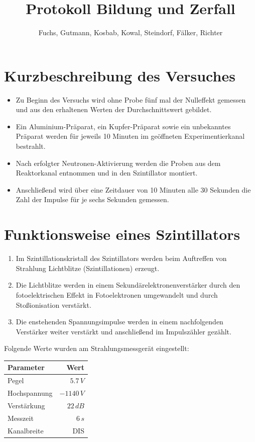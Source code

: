 \documentclass[12pt,german]{article}
\title{\vspace{-1.5cm}Protokoll Bildung und Zerfall}
\author{Fuchs, Gutmann, Kosbab, Kowal, Steindorf, Fälker, Richter}
\begin{document}
    \maketitle
    \tableofcontents

    \section{Kurzbeschreibung des Versuches}
    \begin{itemize}
        \item Zu Beginn des Versuchs wird ohne Probe fünf mal der Nulleffekt gemessen und aus den erhaltenen Werten der Durchschnittswert gebildet.
        \item Ein Aluminium-Präparat, ein Kupfer-Präparat sowie ein unbekanntes Präparat werden für jeweils 10 Minuten im geöffneten Experimentierkanal bestrahlt.
        \item Nach erfolgter Neutronen-Aktivierung werden die Proben aus dem Reaktorkanal entnommen und in den Szintillator montiert.
        \item Anschließend wird über eine Zeitdauer von 10 Minuten alle 30 Sekunden die Zahl der Impulse für je sechs Sekunden gemessen.
    \end{itemize}

    \section{Funktionsweise eines Szintillators}
    \begin{enumerate}
        \item Im Szintillationskristall des Szintillators werden beim Auftreffen von Strahlung Lichtblitze (Szintillationen) erzeugt.
        \item Die Lichtblitze werden in einem Sekundärelektronenverstärker durch den fotoelektrischen Effekt in Fotoelektronen umgewandelt und durch Stoßionisation verstärkt.
        \item Die enstehenden Spannungsimpulse werden in einem nachfolgenden Verstärker weiter verstärkt und anschließend im Impulszähler gezählt.
    \end{enumerate}
    Folgende Werte wurden am Strahlungsmessgerät eingestellt:
    \begin{table}[H]
        \centering
        \begin{tabularx}{0.7\textwidth}{L|R}
            \toprule
            \textbf{Parameter} & \textbf{Wert} \\
            \midrule
            Pegel & $5.7\, V$ \\
            Hochspannung & $-1140\, V$ \\
            Verstärkung & $22\, dB$ \\
            Messzeit & $6\, s$ \\
            Kanalbreite & DIS \\
            \bottomrule
        \end{tabularx}
    \end{table}
\end{document}
